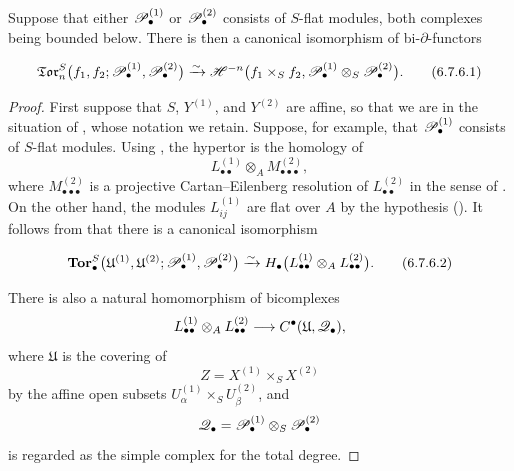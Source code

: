 \begin{proposition}[6.7.6]
\label{III.6.7.6}
Suppose that either $\mathscr{P}_\bullet^{(1)}$ or
$\mathscr{P}_\bullet^{(2)}$ consists of $S$-flat modules, both
complexes being bounded below.  There is then a canonical
isomorphism of bi-$\partial$-functors
\begin{env}[6.7.6.1]
\label{III.6.7.6.1}
\[
  \mathfrak{Tor}_n^S
  \bigl(
    f_1,f_2;
    \mathscr{P}_\bullet^{(1)},\mathscr{P}_\bullet^{(2)}
  \bigr)
  \xrightarrow{\sim}
  \mathscr{H}^{-n}
  \bigl(
    f_1\times_Sf_2,
    \mathscr{P}_\bullet^{(1)}
    \otimes_S\mathscr{P}_\bullet^{(2)}
  \bigr).
  \tag{6.7.6.1}\label{III.6.7.6.1.eq}
\]
\end{env}
\end{proposition}

\begin{proof}
First suppose that $S$, $Y^{(1)}$, and $Y^{(2)}$ are affine, so
that we are in the situation of , whose notation
we retain.  Suppose, for example, that
$\mathscr{P}_\bullet^{(1)}$ consists of $S$-flat modules.  Using
, the hypertor is the homology of
\[
  L_{\bullet\bullet}^{(1)}
  \otimes_A M_{\bullet\bullet\bullet}^{(2)},
\]
where $M_{\bullet\bullet\bullet}^{(2)}$ is a projective
Cartan--Eilenberg resolution of $L_{\bullet\bullet}^{(2)}$ in
the sense of .  On the other hand, the modules
$L_{ij}^{(1)}$ are flat over $A$ by the hypothesis
().  It follows from
 that there is a canonical isomorphism
\begin{env}[6.7.6.2]
\label{III.6.7.6.2}
\[
  \mathbf{Tor}_\bullet^S
  \bigl(
    \mathfrak U^{(1)},\mathfrak U^{(2)};
    \mathscr{P}_\bullet^{(1)},\mathscr{P}_\bullet^{(2)}
  \bigr)
  \xrightarrow{\sim}
  H_\bullet
  \bigl(
    L_{\bullet\bullet}^{(1)}
    \otimes_A L_{\bullet\bullet}^{(2)}
  \bigr).
  \tag{6.7.6.2}\label{III.6.7.6.2.eq}
\]
\end{env}

There is also a natural homomorphism of bicomplexes
\[
  L_{\bullet\bullet}^{(1)}
  \otimes_A L_{\bullet\bullet}^{(2)}
  \longrightarrow
  C^\bullet(\mathfrak U,\mathscr{Q}_\bullet),
\]
where $\mathfrak U$ is the covering of
\[
  Z=X^{(1)}\times_SX^{(2)}
\]
by the affine open subsets
$U_\alpha^{(1)}\times_SU_\beta^{(2)}$, and
\[
  \mathscr{Q}_\bullet
  =
  \mathscr{P}_\bullet^{(1)}
  \otimes_S\mathscr{P}_\bullet^{(2)}
\]
is regarded as the simple complex for the total degree.



\end{proof}
